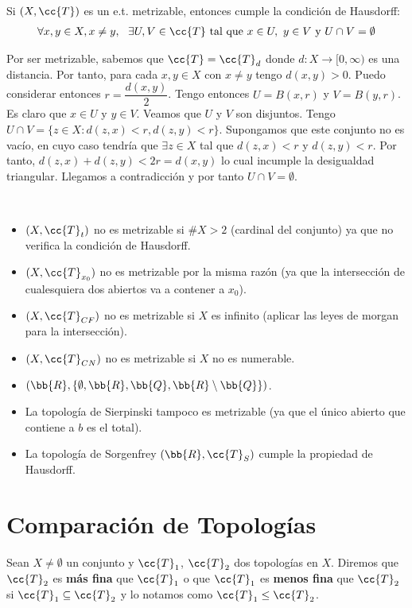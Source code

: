 \begin{ejercicio}
    Si $(X,\cc{T})$ es un e.t. metrizable, entonces cumple la condición de Hausdorff:
    \begin{gather*}
        \forall x,y\in X, x\neq y, \ \ \exists U,V \in \cc{T} \text{ tal que }x\in U,\ y\in V \text{ y } U \cap V = \emptyset
    \end{gather*}

    Por ser metrizable, sabemos que $\cc{T}=\cc{T}_d$ donde $d:X \to [0,\infty)$ es una distancia. Por tanto, para cada $x,y\in X$ con $x\neq y$ tengo $d(x,y)>0$. Puedo considerar entonces $r=\dfrac{d(x,y)}{2}$. Tengo entonces $U=B(x,r)$ y $V=B(y,r)$. Es claro que $x\in U$ y $y\in V$. Veamos que $U$ y $V$ son disjuntos. Tengo $U\cap V =\{z\in X : d(z,x)<r ,d(z,y)<r\}$. Supongamos que este conjunto no es vacío, en cuyo caso tendría que $\exists z \in X$ tal que $d(z,x)<r$ y $d(z,y)<r$. Por tanto, $d(z,x)+d(z,y)<2r = d(x,y)$ lo cual incumple la desigualdad triangular. Llegamos a contradicción y por tanto $U\cap V=\emptyset$.
    \endsquare
\end{ejercicio}

\begin{ejemplo}\
    \begin{itemize}
        \item $(X,\cc{T}_t)$ no es metrizable si $\#X>2$ (cardinal del conjunto) ya que no verifica la condición de Hausdorff.
        \item $(X, \cc{T}_{x_0})$ no es metrizable por la misma razón (ya que la intersección de cualesquiera dos abiertos va a contener a $x_0$).
        \item $(X, \cc{T}_{CF})$ no es metrizable si $X$ es infinito (aplicar las leyes de morgan para la intersección).
        \item $(X, \cc{T}_{CN})$ no es metrizable si $X$ no es numerable.
        \item $(\bb{R}, \{\emptyset, \bb{R}, \bb{Q}, \bb{R}\setminus \bb{Q}\})$.
        \item La topología de Sierpinski tampoco es metrizable (ya que el único abierto que contiene a $b$ es el total).
        \item La topología de Sorgenfrey $(\bb{R}, \cc{T}_S)$ cumple la propiedad de Hausdorff.
    \end{itemize}
    \endsquare
\end{ejemplo}

\section{Comparación de Topologías}
\begin{definicion}
    Sean $X\neq \emptyset$ un conjunto y $\cc{T}_1$, $\cc{T}_2$ dos topologías en $X$. Diremos que $\cc{T}_2$ es \textbf{más fina} que $\cc{T}_1$ o que $\cc{T}_1$ es \textbf{menos fina} que $\cc{T}_2$ si $\cc{T}_1\subseteq \cc{T}_2$ y lo notamos como $\cc{T}_1 \leq \cc{T}_2$.
    \endsquare
\end{definicion}

